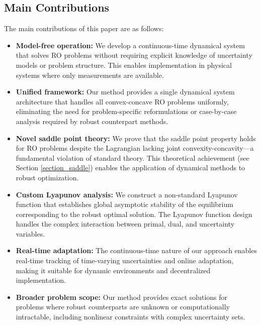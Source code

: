 \documentclass[journal,twoside,web]{ieeecolor}
\newcommand{\rev}[1]{\textcolor{revisionblue}{#1}}
\begin{document}
\subsection*{\rev{Main Contributions}} 
\rev{The main contributions of this paper are as follows:
\begin{itemize}
\item \textbf{Model-free operation:} We develop a continuous-time dynamical system that solves RO problems without requiring explicit knowledge of uncertainty models or problem structure. This enables implementation in physical systems where only measurements are available.

\item \textbf{Unified framework:} Our method provides a single dynamical system architecture that handles all convex-concave RO problems uniformly, eliminating the need for problem-specific reformulations or case-by-case analysis required by robust counterpart methods.

\item \textbf{Novel saddle point theory:} We prove that the saddle point property holds for RO problems despite the Lagrangian lacking joint convexity-concavity—a fundamental violation of standard theory. This theoretical achievement (see Section \ref{section_saddle}) enables the application of dynamical methods to robust optimization.

\item \textbf{Custom Lyapunov analysis:} We construct a non-standard Lyapunov function that establishes global asymptotic stability of the equilibrium corresponding to the robust optimal solution. The Lyapunov function design handles the complex interaction between primal, dual, and uncertainty variables.

\item \textbf{Real-time adaptation:} The continuous-time nature of our approach enables real-time tracking of time-varying uncertainties and online adaptation, making it suitable for dynamic environments and decentralized implementation.

\item \textbf{Broader problem scope:} Our method provides exact solutions for problems where robust counterparts are unknown or computationally intractable, including nonlinear constraints with complex uncertainty sets.
\end{itemize}
}


\end{document}
